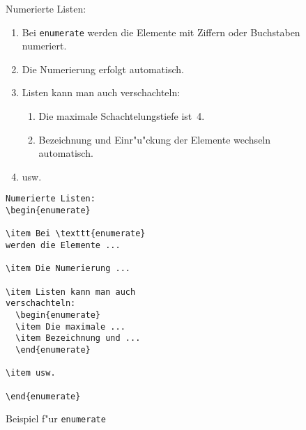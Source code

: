 \begin{figure}[!htbp]
\oben{\textwidth}
\exa
Numerierte Listen:
\begin{enumerate}
\relax %
\item Bei \texttt{enumerate} werden
die Elemente mit Ziffern oder Buchstaben numeriert.
\item Die Numerierung erfolgt
automatisch.
\item Listen kann man auch
verschachteln:
  \begin{enumerate}
  \item Die maximale Schachtelungstiefe
  ist~4.
  \item Bezeichnung und Ein\-r"u"ckung der Elemente
  wechseln automatisch.
  \end{enumerate}
\item usw.
\end{enumerate}
\exb
\begin{verbatim}
Numerierte Listen:
\begin{enumerate}
 
\item Bei \texttt{enumerate}
werden die Elemente ...
 
\item Die Numerierung ...
 
\item Listen kann man auch
verschachteln:
  \begin{enumerate}
  \item Die maximale ...
  \item Bezeichnung und ...
  \end{enumerate}
 
\item usw.
 
\end{enumerate}
\end{verbatim}
\exc
\unten
\caption{Beispiel f"ur \texttt{enumerate}} \label{enum}
\end{figure}
 
